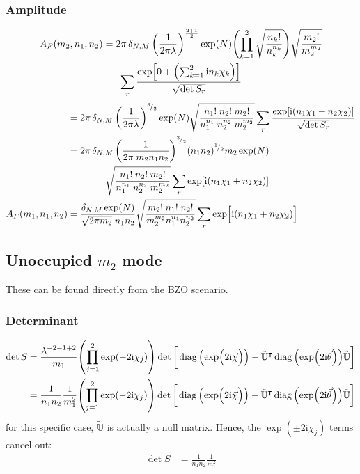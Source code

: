 \documentclass[
	english,
	a4paper,
	fontsize=10pt,
	parskip=half,
	titlepage=true,
	DIV=12,
	final
]{scrreprt}
\newcommand*{\smallfrac}  [2]{\ensuremath{{}^        {#1} \!/_        {#2}}}
\newcommand*{\transp}{\ensuremath{^\intercal}}
\newcommand*{\iunit}{\ensuremath{\mathrm{i}}}
\DeclareMathOperator{\diag}{diag}
\begin{document}
\subsubsection{Amplitude}
\begin{multline}
	A_F(m_2, n_1, n_2)
=
	2\pi \, \delta_{N,M} \, \qty(
		\frac{1}{2\pi\lambda}
	)^{\frac{2 + 1}{2}}
	\exp(N)
	\qty( \prod_{k=1}^{2}
		\sqrt{\frac
			{ n_k! }
			{ n_k^{n_k} }
	})
		\sqrt{\frac
			{ m_2! }
			{ m_2^{m_2} }
	}
\\
	\sum_r
		\frac
		{\exp[
			0+ \qty(  \sum_{k=1}^{2} \iunit n_k \chi  _k)
		]}
		{\sqrt{\det S_r}}
\end{multline}
\begin{align}
&=
	2\pi \, \delta_{N,M} \, \qty(
		\frac{1}{2\pi\lambda}
	)^{\smallfrac{3}{2}}
	\exp(N)
		\sqrt{\frac
			{ n_1! \; n_2! \; m_2! }
			{ n_1^{n_1} \; n_2^{n_2} \; m_2^{m_2}}
	}
	\sum_r
		\frac
		{\exp[
			\iunit ( n_1 \chi_1 + n_2 \chi_2 )
		]}
		{\sqrt{\det S_r}} \\
&=
\nonumber
	2\pi \, \delta_{N,M} \, \qty(
		\frac{1}{2\pi \; m_2 n_1 n_2}
	)^{\smallfrac{3}{2}}
	(n_1 n_2)^{\smallfrac{1}{2}} m_2
	\exp(N)
	\\ & \qquad\qquad
	\sqrt{\frac
		{ n_1! \; n_2! \; m_2! }
		{ n_1^{n_1} \; n_2^{n_2} \; m_2^{m_2}}
	}
	\sum_r
		\exp[
			\iunit ( n_1 \chi_1 + n_2 \chi_2 )
		]
\\
	A_F(m_1, n_1, n_2)
&=
	\frac
		{ \delta_{N,M} \exp(N) }
		{ \sqrt{2\pi m_2} \; n_1 n_2 }
	\sqrt{\frac
		{ m_2! \; n_1! \; n_2! }
		{ m_2^{m_2} n_1^{n_1} n_2^{n_2} }
	}
	\sum_r
		\exp[ \Big.
			\iunit \qty(  
			n_1 \chi_1 + n_2 \chi_2)
		]
\end{align}

\subsection{Unoccupied $m_2$ mode}
These can be found directly from the BZO scenario.

\subsubsection{Determinant}
\begin{align}
	\det S
&=
	\frac{ \lambda^{-2 - 1 + 2} }{ m_1 }
	\qty( \prod_{j=1}^{2} \exp(-2\iunit \chi_j) )
	\det\qty[\bigg.
		\diag\qty(\exp(\Big.2\iunit\vec{\chi}))
		-
		\tilde{\mathbb{U}}\transp
		\diag\qty(\exp(2\iunit\vec{\theta}))
		\tilde{\mathbb{U}}
	] \\
&=
	\frac{1}{n_1 n_2}
	\frac{1}{m_1^{2}}
	\qty( \prod_{j=1}^{2} \exp(-2\iunit \chi_j) )
	\det\qty[\bigg.
		\diag\qty(\exp(\Big.2\iunit\vec{\chi}))
		-
		\tilde{\mathbb{U}}\transp
		\diag\qty(\exp(2\iunit\vec{\theta}))
		\tilde{\mathbb{U}}
	]
\end{align}
for this specific case, $\tilde{\mathbb{U}}$ is actually a null matrix. Hence, the 
$\exp(\pm 2\iunit \chi_j)$ terms cancel out:
\begin{align}
	\det S
&=
	\frac{1}{n_1 n_2}
	\frac{1}{m_1^{2}}
\end{align}
\end{document}
